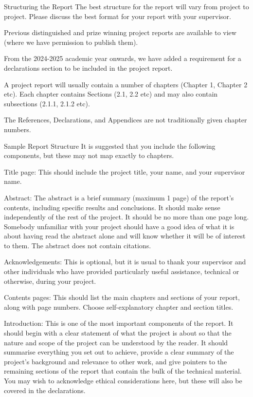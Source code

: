 Structuring the Report
The best structure for the report will vary from project to project. Please discuss the best format for your report with your supervisor.

Previous distinguished and prize winning project reports are available to view (where we have permission to publish them). 

From the 2024-2025 academic year onwards, we have added a requirement for a declarations section to be included in the project report.

A project report will usually contain a number of chapters (Chapter 1, Chapter 2 etc). Each chapter contains Sections (2.1, 2.2 etc) and may also contain subsections (2.1.1, 2.1.2 etc).

The References, Declarations, and Appendices are not traditionally given chapter numbers.

Sample Report Structure
It is suggested that you include the following components, but these may not map exactly to chapters.

Title page: This should include the project title, your name, and your supervisor name.

Abstract: The abstract is a brief summary (maximum 1 page) of the report's contents, including specific results and conclusions. It should make sense independently of the rest of the project. It should be no more than one page long. Somebody unfamiliar with your project should have a good idea of what it is about having read the abstract alone and will know whether it will be of interest to them. The abstract does not contain citations.

Acknowledgements: This is optional, but it is usual to thank your supervisor and other individuals who have provided particularly useful assistance, technical or otherwise, during your project. 

Contents pages: This should list the main chapters and sections of your report, along with page numbers. Choose self-explanatory chapter and section titles. 

Introduction: This is one of the most important components of the report. It should begin with a clear statement of what the project is about so that the nature and scope of the project can be understood by the reader. It should summarise everything you set out to achieve, provide a clear summary of the project's background and relevance to other work, and give pointers to the remaining sections of the report that contain the bulk of the technical material. You may wish to acknowledge ethical considerations here, but these will also be covered in the declarations.

